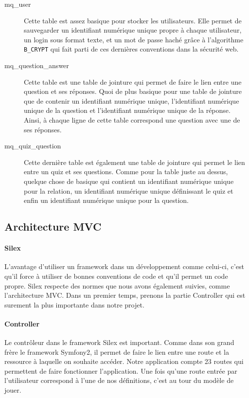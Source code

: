 \documentclass[12pt]{article}
\begin{document}
\begin{description}
            \item[mq\_user] Cette table est assez basique pour stocker les utilisateurs. Elle permet de sauvegarder un identifiant numérique unique propre à chaque utilisateur, un login sous format texte, et un mot de passe haché grâce à l'algorithme \texttt{B\_CRYPT} qui fait parti de ces dernières conventions dans la sécurité web.
            \item[mq\_question\_answer] Cette table est une table de jointure qui permet de faire le lien entre une question et ses réponses. Quoi de plus basique pour une table de jointure que de contenir un identifiant numérique unique, l'identifiant numérique unique de la question et l'identifiant numérique unique de la réponse. Ainsi, à chaque ligne de cette table correspond une question avec une de ses réponses.
            \item[mq\_quiz\_question] Cette dernière table est également une table de jointure qui permet le lien entre un quiz et ses questions. Comme pour la table juste au dessus, quelque chose de basique qui contient un identifiant numérique unique pour la relation, un identifiant numérique unique définissant le quiz et enfin un identifiant numérique unique pour la question.
        \end{description}
    
    \subsection{Architecture MVC}
        \paragraph{Silex} L'avantage d'utiliser un framework dans un développement comme celui-ci, c'est qu'il force à utiliser de bonnes conventions de code et qu'il permet un code propre. Silex respecte des normes que nous avons également suivies, comme l'architecture MVC. Dans un premier temps, prenons la partie Controller qui est surement la plus importante dans notre projet. 
        
        \paragraph{Controller} Le contrôleur dans le framework Silex est important. Comme dans son grand frère le framework Symfony2, il permet de faire le lien entre une route et la ressource à laquelle on souhaite accéder. Notre application compte 23 routes qui permettent de faire fonctionner l'application. Une fois qu'une route entrée par l'utilisateur correspond à l'une de nos définitions, c'est au tour du modèle de jouer.
        
\end{document}

